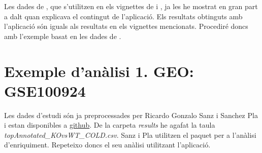 Les dades de \cite{schmidt2008humoral}, que s'utilitzen en els vignettes de  i , ja les he mostrat en gran part a dalt quan explicava el contingut de l'aplicació. Els resultats obtinguts amb l'aplicació són iguals als resultats en els vignettes mencionats. Procediré doncs amb l'exemple basat en les dades de \cite{li2017zbtb7b} .

\section{Exemple d'anàlisi 1. GEO: GSE100924}

Les dades d'estudi \cite{li2017zbtb7b} són ja preprocessades per Ricardo Gonzalo Sanz i Sanchez Pla i estan disponibles a \href{https://github.com/alexsanchezpla/StatisticalAnalysisOfMicroarrayData}{github}. De la carpeta \textit{results} he agafat la taula \textit{topAnnotated\_KOvsWT\_COLD.csv}. Sanz i Pla utilitzen el paquet  per a l'anàlisi d'enriquiment. Repeteixo doncs el seu anàlisi utilitzant l'aplicació. 

